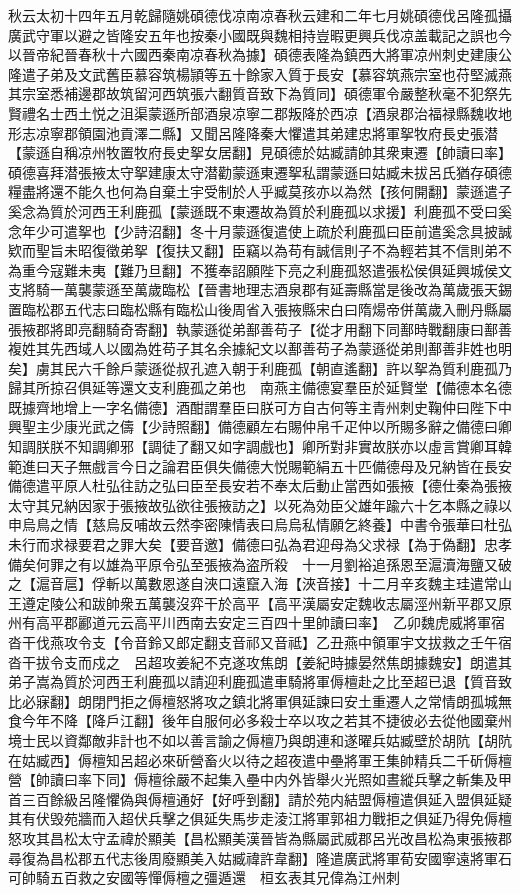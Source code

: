 秋云太初十四年五月乾歸隨姚碩德伐凉南凉春秋云建和二年七月姚碩德伐呂隆孤攝廣武守軍以避之皆隆安五年也按秦小國既與魏相持豈暇更興兵伐凉盖載記之誤也今以晉帝紀晉春秋十六國西秦南凉春秋為據】碩德表隆為鎮西大將軍凉州刺史建康公隆遣子弟及文武舊臣慕容筑楊頴等五十餘家入質于長安【慕容筑燕宗室也苻堅滅燕其宗室悉補邊郡故筑留河西筑張六翻質音致下為質同】碩德軍令嚴整秋毫不犯祭先賢禮名士西土悦之沮渠蒙遜所部酒泉凉寧二郡叛降於西凉【酒泉郡治福禄縣魏收地形志凉寧郡領園池貢澤二縣】又聞呂隆降秦大懼遣其弟建忠將軍挐牧府長史張潜【蒙遜自稱凉州牧置牧府長史挐女居翻】見碩德於姑臧請帥其衆東遷【帥讀曰率】碩德喜拜潜張掖太守挐建康太守潜勸蒙遜東遷挐私謂蒙遜曰姑臧未拔呂氏猶存碩德糧盡將還不能久也何為自棄土宇受制於人乎臧莫孩亦以為然【孩何開翻】蒙遜遣子奚念為質於河西王利鹿孤【蒙遜既不東遷故為質於利鹿孤以求援】利鹿孤不受曰奚念年少可遣挐也【少詩沼翻】冬十月蒙遜復遣使上疏於利鹿孤曰臣前遣奚念具披誠欵而聖旨未昭復徵弟挐【復扶又翻】臣竊以為苟有誠信則子不為輕若其不信則弟不為重今寇難未夷【難乃旦翻】不獲奉詔願陛下亮之利鹿孤怒遣張松侯俱延興城侯文支將騎一萬襲蒙遜至萬歲臨松【晉書地理志酒泉郡有延壽縣當是後改為萬歲張天錫置臨松郡五代志曰臨松縣有臨松山後周省入張掖縣宋白曰隋煬帝併萬歲入刪丹縣屬張掖郡將即亮翻騎奇寄翻】執蒙遜從弟鄯善苟子【從才用翻下同鄯時戰翻康曰鄯善複姓其先西域人以國為姓苟子其名余據紀文以鄯善苟子為蒙遜從弟則鄯善非姓也明矣】虜其民六千餘戶蒙遜從叔孔遮入朝于利鹿孤【朝直遙翻】許以挐為質利鹿孤乃歸其所掠召俱延等還文支利鹿孤之弟也　南燕主備德宴羣臣於延賢堂【備德本名德既據齊地增上一字名備德】酒酣謂羣臣曰朕可方自古何等主青州刺史鞠仲曰陛下中興聖主少康光武之儔【少詩照翻】備德顧左右賜仲帛千疋仲以所賜多辭之備德曰卿知調朕朕不知調卿邪【調徒了翻又如字調戲也】卿所對非實故朕亦以虛言賞卿耳韓範進曰天子無戲言今日之論君臣俱失備德大悦賜範絹五十匹備德母及兄納皆在長安備德遣平原人杜弘往訪之弘曰臣至長安若不奉太后動止當西如張掖【德仕秦為張掖太守其兄納因家于張掖故弘欲往張掖訪之】以死為効臣父雄年踰六十乞本縣之祿以申烏鳥之情【慈烏反哺故云然李密陳情表曰烏烏私情願乞終養】中書令張華曰杜弘未行而求禄要君之罪大矣【要音邀】備德曰弘為君迎母為父求禄【為于偽翻】忠孝備矣何罪之有以雄為平原令弘至張掖為盗所殺　十一月劉裕追孫恩至滬瀆海鹽又破之【滬音扈】俘斬以萬數恩遂自浹口遠竄入海【浹音接】十二月辛亥魏主珪遣常山王遵定陵公和跋帥衆五萬襲沒弈干於高平【高平漢屬安定魏收志屬涇州新平郡又原州有高平郡酈道元云高平川西南去安定三百四十里帥讀曰率】　乙卯魏虎威將軍宿沓干伐燕攻令支【令音鈴又郎定翻支音祁又音祗】乙丑燕中領軍宇文拔救之壬午宿沓干拔令支而戍之　呂超攻姜紀不克遂攻焦朗【姜紀時據晏然焦朗據魏安】朗遣其弟子嵩為質於河西王利鹿孤以請迎利鹿孤遣車騎將軍傉檀赴之比至超已退【質音致比必寐翻】朗閉門拒之傉檀怒將攻之鎮北將軍俱延諫曰安土重遷人之常情朗孤城無食今年不降【降戶江翻】後年自服何必多殺士卒以攻之若其不捷彼必去從他國棄州境士民以資鄰敵非計也不如以善言諭之傉檀乃與朗連和遂曜兵姑臧壁於胡阬【胡阬在姑臧西】傉檀知呂超必來斫營畜火以待之超夜遣中壘將軍王集帥精兵二千斫傉檀營【帥讀曰率下同】傉檀徐嚴不起集入壘中内外皆舉火光照如晝縱兵擊之斬集及甲首三百餘級呂隆懼偽與傉檀通好【好呼到翻】請於苑内結盟傉檀遣俱延入盟俱延疑其有伏毁苑牆而入超伏兵擊之俱延失馬步走淩江將軍郭祖力戰拒之俱延乃得免傉檀怒攻其昌松太守孟禕於顯美【昌松顯美漢晉皆為縣屬武威郡呂光改昌松為東張掖郡尋復為昌松郡五代志後周廢顯美入姑臧禕許韋翻】隆遣廣武將軍荀安國寧遠將軍石可帥騎五百救之安國等憚傉檀之彊遁還　桓玄表其兄偉為江州刺